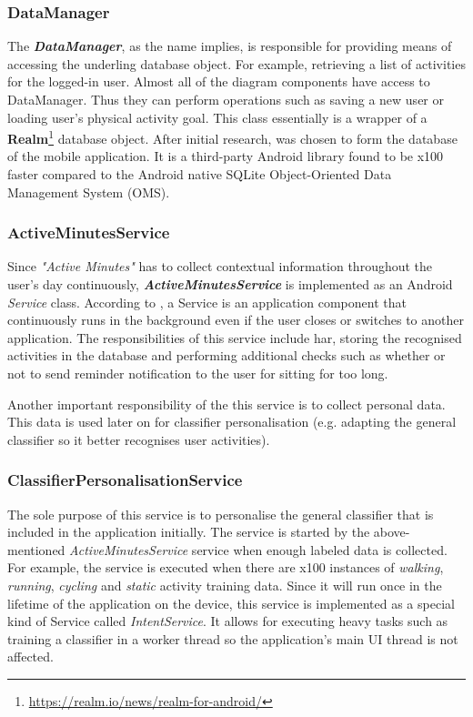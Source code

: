             \subsubsection{DataManager}
            \label{section:data-manager}
            The \textbf{\textit{DataManager}}, as the name implies, is responsible for providing means of accessing the underling database object. For example, retrieving a list of activities for the logged-in user. Almost all of the diagram components have access to DataManager. Thus they can perform operations such as saving a new user or loading user's physical activity goal. This class essentially is a wrapper of a \textbf{Realm}\footnote{\url{https://realm.io/news/realm-for-android/}} database object. After initial research, \citet{realm2014} was chosen to form the database of the mobile application. It is a third-party Android library found to be x100 faster compared to the Android native SQLite Object-Oriented Data Management System (OMS).
            
            \subsubsection{ActiveMinutesService}
            \label{section:active-minutes-service}
            Since \textit{"Active Minutes"} has to collect contextual information throughout the user's day continuously, \textbf{\textit{ActiveMinutesService}} is implemented as an Android \textit{Service} class. According to \citet{googleservices2017}, a Service is an application component that continuously runs in the background even if the user closes or switches to another application. The responsibilities of this service include \gls{har}, storing the recognised activities in the database and performing additional checks such as whether or not to send reminder notification to the user for sitting for too long.
            
            Another important responsibility of the this service is to collect personal data. This data is used later on for classifier personalisation (e.g. adapting the general classifier so it better recognises user activities).
            
            \subsubsection{ClassifierPersonalisationService}
            The sole purpose of this service is to personalise the general classifier that is included in the application initially. The service is started by the above-mentioned \textit{ActiveMinutesService} service when enough labeled data is collected. For example, the service is executed when there are x100 instances of \textit{walking}, \textit{running}, \textit{cycling} and \textit{static} activity training data. Since it will run once in the lifetime of the application on the device, this service is implemented as a special kind of Service called \textit{IntentService}. It allows for executing heavy tasks such as training a classifier in a worker thread so the application's main UI thread is not affected.
            
